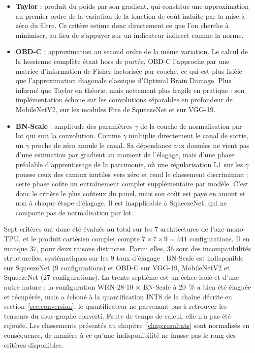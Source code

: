 \documentclass[11pt,a4paper]{report}
\begin{document}
\begin{itemize}
  \item \textbf{Taylor} : produit du poids par son gradient, qui constitue une approximation au premier ordre de la variation de la fonction de coût induite par la mise à zéro du filtre. Ce critère estime donc directement ce que l'on cherche à minimiser, au lieu de s'appuyer sur un indicateur indirect comme la norme.
  \item \textbf{OBD-C} : approximation au second ordre de la même variation. Le calcul de la hessienne complète étant hors de portée, OBD-C l'approche par une matrice d'information de Fisher factorisée par couche, ce qui est plus fidèle que l'approximation diagonale classique d'Optimal Brain Damage. Plus informé que Taylor en théorie, mais nettement plus fragile en pratique : son implémentation échoue sur les convolutions séparables en profondeur de MobileNetV2, sur les modules Fire de SqueezeNet et sur VGG-19.
  \item \textbf{BN-Scale} : amplitude des paramètres $\gamma$ de la couche de normalisation par lot qui suit la convolution. Comme $\gamma$ multiplie directement le canal de sortie, un $\gamma$ proche de zéro annule le canal. Sa dépendance aux données ne vient pas d'une estimation par gradient au moment de l'élagage, mais d'une phase préalable d'apprentissage de la parcimonie, où une régularisation L1 sur les $\gamma$ pousse ceux des canaux inutiles vers zéro et rend le classement discriminant ; cette phase coûte un entraînement complet supplémentaire par modèle. C'est donc le critère le plus coûteux du panel, mais son coût est payé en amont et non à chaque étape d'élagage. Il est inapplicable à SqueezeNet, qui ne comporte pas de normalisation par lot.
\end{itemize}

Sept critères ont donc été évalués au total sur les 7 architectures de l'axe mono-TPU, et le produit cartésien complet compte $7 \times 7 \times 9 = 441$ configurations. Il en manque 37, pour deux raisons distinctes. Parmi elles, 36 sont des incompatibilités structurelles, systématiques sur les 9 taux d'élagage : BN-Scale est indisponible sur SqueezeNet (9 configurations) et OBD-C sur VGG-19, MobileNetV2 et SqueezeNet (27 configurations). La trente-septième est un échec isolé et d'une autre nature : la configuration WRN-28-10 $\times$ BN-Scale à 20~\% a bien été élaguée et récupérée, mais a échoué à la quantification INT8 de la chaîne décrite en section~\ref{sec:conversion}, le quantificateur ne parvenant pas à retrouver les tenseurs du sous-graphe converti. Faute de temps de calcul, elle n'a pas été rejouée. Les classements présentés au chapitre~\ref{chap:resultats} sont normalisés en conséquence, de manière à ce qu'une indisponibilité ne fausse pas le rang des critères disponibles.
\end{document}
